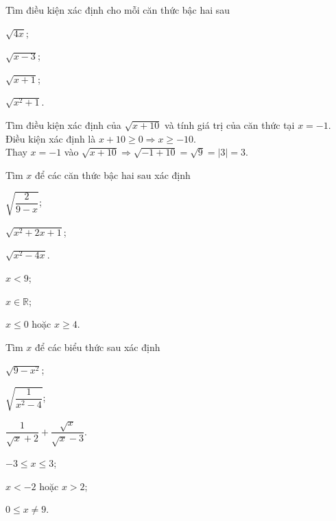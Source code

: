\begin{bt}
	Tìm điều kiện xác định cho mỗi căn thức bậc hai sau
	\begin{listEX}[4]
	\item $\sqrt{4x}$;
	\item $\sqrt{x-3}$;
	\item $\sqrt{x+1}$;
	\item $\sqrt{x^2+1}$.
	\end{listEX}
\end{bt}
\begin{bt}
	Tìm điều kiện xác định của $\sqrt{x+10}$ và tính giá trị của căn thức tại $x=-1$.
	\loigiai
	{
	Điều kiện xác định là $x+10\ge 0\Rightarrow x\ge -10$.\\
	Thay $x=-1$ vào $\sqrt{x+10}\Rightarrow \sqrt{-1+10}=\sqrt{9}=\big|3\big|=3$.	
	}
\end{bt}
\begin{bt}%
	Tìm $x$ để các căn thức bậc hai sau xác định 
	\begin{listEX}[3]
	\item $\sqrt{\dfrac{2}{9-x}}$;
	\item $\sqrt{x^2+2x+1}$;
	\item $\sqrt{x^2-4x}$.
	\end{listEX}
	\loigiai
	{
	\begin{listEX}[3]
	\item $x<9$;
	\item $x\in\mathbb{R}$;
	\item $x\leq 0$ hoặc $x\geq 4$.
	\end{listEX}}
\end{bt}
\begin{bt}%
	Tìm $x$ để các biểu thức sau xác định 
	\begin{listEX}[3]
	\item $\sqrt{9-x^2}$;
	\item $\sqrt{\dfrac{1}{x^2-4}}$;
	\item $\dfrac{1}{\sqrt{x}+2}+\dfrac{\sqrt{x}}{\sqrt{x}-3}$.
	\end{listEX}
	\loigiai
	{
	\begin{listEX}[3]
	\item $-3\leq x\leq 3$;
	\item $x<-2$ hoặc $x>2$;
	\item $0\leq x\neq 9$.
	\end{listEX}	}
\end{bt}
